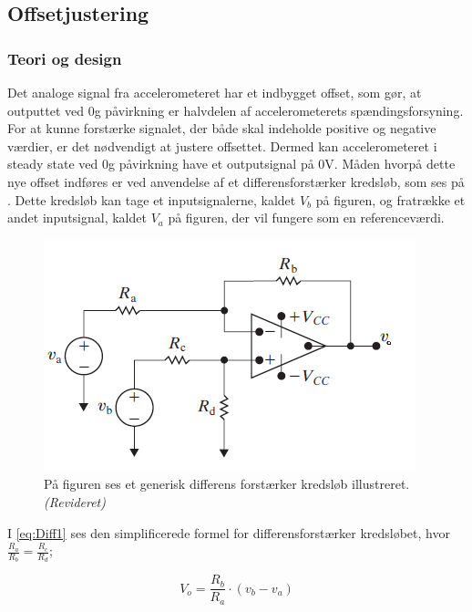 \subsection{Offsetjustering}
\subsubsection{Teori og design} \label{Offset_Teori_Design}
Det analoge signal fra accelerometeret har et indbygget offset, som gør, at outputtet ved $0$g påvirkning er halvdelen af accelerometerets spændingsforsyning. For at kunne forstærke signalet, der både skal indeholde positive og negative værdier, er det nødvendigt at justere offsettet. Dermed kan accelerometeret i steady state ved $0$g påvirkning have et outputsignal på $0$V. Måden hvorpå dette nye offset indføres er ved anvendelse af et differensforstærker kredsløb, som ses på . Dette kredsløb kan tage et inputsignalerne, kaldet $V_{b}$ på figuren, og fratrække et andet inputsignal, kaldet $V_{a}$ på figuren, der vil fungere som en referenceværdi.

\begin{figure}[H]
\centering
\includegraphics[scale=1.3]{figures/cProblemloesning/Differensforstaerker_generisk.png}
\caption{På figuren ses et generisk differens forstærker kredsløb illustreret.\textit{(Revideret)} \cite{Nilsson2011}}
\label{fig:Differensforstaerker_generisk}
\end{figure}

\noindent I \eqref{eq:Diff1} ses den simplificerede formel for differensforstærker kredsløbet, hvor $\frac{R_a}{R_b} = \frac{R_c}{R_d}$;

\begin{equation}\label{eq:Diff1}
V_o = \frac{R_b}{R_a} \cdot (v_b - v_a)
\end{equation}

